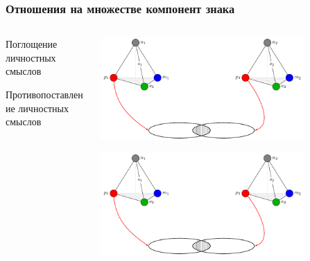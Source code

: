\documentclass[default]{beamer}
\begin{document}
	\begin{frame}
		\frametitle{Отношения на множестве компонент знака}
		
		\begin{columns}
			\begin{column}{0.3\textwidth}
				\centering
				Поглощение личностных смыслов 
				\par\bigskip
				\par\bigskip
				\par\bigskip
				\par\bigskip
				\par\bigskip
				Противопоставление личностных смыслов 
				
			\end{column}
			\begin{column}{0.7\textwidth}
				\includegraphics[page=5,width=0.8\textwidth]{signs/sign_relations}
				\par\bigskip
				\includegraphics[page=6,width=0.8\textwidth]{signs/sign_relations}
			\end{column}
		\end{columns}
		
	\end{frame}	
	
\end{document}
